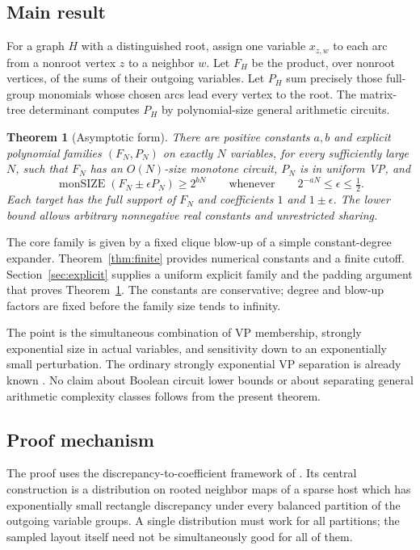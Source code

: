 \documentclass[11pt]{article}
\newtheorem{theorem}{Theorem}[section]
\theoremstyle{definition}
\theoremstyle{remark}
\numberwithin{equation}{section}
\begin{document}
\subsection{Main result}

For a graph \(H\) with a distinguished root, assign one variable
\(x_{z,w}\) to each arc from a nonroot vertex \(z\) to a neighbor \(w\).
Let \(F_H\) be the product, over nonroot vertices, of the sums of
their outgoing variables. Let \(P_H\) sum precisely those full-group
monomials whose chosen arcs lead every vertex to the root.
The matrix-tree determinant computes \(P_H\) by polynomial-size
general arithmetic circuits.

\begin{theorem}[Asymptotic form]\label{thm:asymptotic}
There are positive constants \(a,b\) and explicit polynomial families
\((F_N,P_N)\) on exactly \(N\) variables, for every sufficiently large \(N\),
such that \(F_N\) has an \(O(N)\)-size monotone circuit, \(P_N\) is in
uniform VP, and
\[
\operatorname{monSIZE}(F_N\pm\epsilon P_N)\ge 2^{bN}
\qquad\text{whenever}\qquad 2^{-aN}\le\epsilon\le\tfrac12.
\]
Each target has the full support of \(F_N\) and coefficients
\(1\) and \(1\pm\epsilon\). The lower bound allows arbitrary
nonnegative real constants and unrestricted sharing.
\end{theorem}

The core family is given by a fixed clique blow-up of a simple
constant-degree expander. Theorem~\ref{thm:finite} provides numerical
constants and a finite cutoff. Section~\ref{sec:explicit} supplies a
uniform explicit family and the padding argument that proves
Theorem~\ref{thm:asymptotic}. The constants are conservative; degree
and blow-up factors are fixed before the family size tends to infinity.

The point is the simultaneous combination of VP membership,
strongly exponential size in actual variables, and sensitivity down
to an exponentially small perturbation. The ordinary strongly
exponential VP separation is already known \cite{CDGM2022}.
No claim about Boolean circuit lower bounds or about separating
general arithmetic complexity classes follows from the present theorem.

\subsection{Proof mechanism}

The proof uses the discrepancy-to-coefficient framework of
\cite{CDM2021,CDGM2022}. Its central construction is a distribution
on rooted neighbor maps of a sparse host which has exponentially small
rectangle discrepancy under every balanced partition of the outgoing
variable groups. A single distribution must work for all partitions;
the sampled layout itself need not be simultaneously good for all of them.
\end{document}
